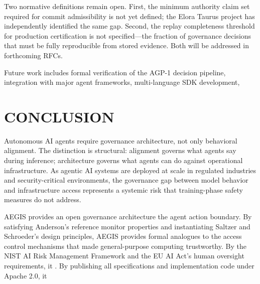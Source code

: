 \documentclass{IEEEcsmag}
\begin{document}
Two normative definitions remain open. First, the minimum authority claim set required for commit admissibility is not yet defined; the Elora Taurus project has independently identified the same gap. Second, the replay completeness threshold for production certification is not specified---the fraction of governance decisions that must be fully reproducible from stored evidence. Both will be addressed in forthcoming RFCs.

Future work includes formal verification of the AGP-1 decision pipeline, integration with major agent frameworks, multi-language SDK development, 

\section{CONCLUSION}

Autonomous AI agents require governance architecture, not only behavioral alignment. The distinction is structural: alignment governs what agents say during inference; architecture governs what agents can do against operational infrastructure. As agentic AI systems are deployed at scale in regulated industries and security-critical environments, the governance gap between model behavior and infrastructure access represents a systemic risk that training-phase safety measures do not address.

AEGIS provides an open governance architecture  the agent action boundary. By satisfying Anderson's reference monitor properties and instantiating Saltzer and Schroeder's design principles, AEGIS provides formal analogues to the access control mechanisms that made general-purpose computing trustworthy. By  the NIST AI Risk Management Framework and the EU AI Act's human oversight requirements, it . By publishing all specifications and implementation code under Apache 2.0, it 
\end{document}
